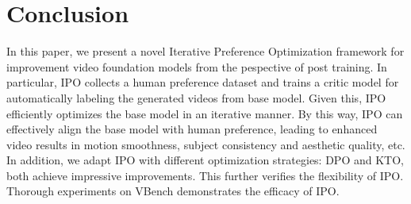 
\section{Conclusion}
In this paper, we present a novel Iterative Preference Optimization framework for improvement video foundation models from the pespective of post training.
In particular, IPO collects a human preference dataset and trains a critic model for automatically labeling the generated videos from base model. Given this, IPO efficiently optimizes the base model in an iterative manner. By this way, IPO can effectively align the base model with human preference, leading to enhanced video results in motion smoothness, subject consistency and aesthetic quality, etc. In addition, we adapt IPO with different optimization strategies: DPO and KTO, both achieve impressive improvements. This further verifies the flexibility of IPO. Thorough experiments on VBench demonstrates the efficacy of IPO. 

